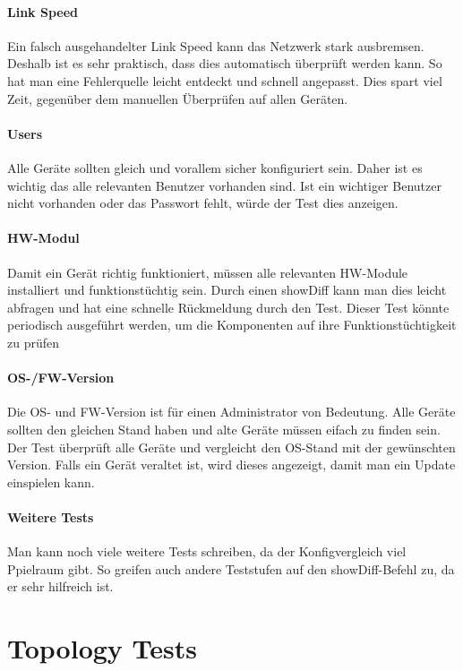 \documentclass[a4,12pt]{scrartcl}
\begin{document}
\paragraph{Link Speed}\newline
Ein falsch ausgehandelter Link Speed kann das Netzwerk stark ausbremsen. Deshalb ist es sehr praktisch, dass dies automatisch überprüft werden kann. So hat man eine Fehlerquelle leicht entdeckt und schnell angepasst. Dies spart viel Zeit, gegenüber dem manuellen Überprüfen auf allen Geräten.
\paragraph{Users}\newline
Alle Geräte sollten gleich und vorallem sicher konfiguriert sein. Daher ist es wichtig das alle relevanten Benutzer vorhanden sind. Ist ein wichtiger Benutzer nicht vorhanden oder das Passwort fehlt, würde der Test dies anzeigen.
\paragraph{HW-Modul}\newline
Damit ein Gerät richtig funktioniert, müssen alle relevanten HW-Module installiert und funktionstüchtig sein. Durch einen showDiff kann man dies leicht abfragen und hat eine schnelle Rückmeldung durch den Test. Dieser Test könnte periodisch ausgeführt werden, um die Komponenten auf ihre Funk­ti­ons­tüch­tig­keit zu prüfen
\paragraph{OS-/FW-Version}\newline
Die OS- und FW-Version ist für einen Administrator von Bedeutung. Alle Geräte sollten den gleichen Stand haben und alte Geräte müssen eifach zu finden sein. Der Test überprüft alle Geräte und vergleicht den OS-Stand mit der gewünschten Version. Falls ein Gerät veraltet ist, wird dieses angezeigt, damit man ein Update einspielen kann.
\paragraph{Weitere Tests}\newline
Man kann noch viele weitere Tests schreiben, da der Konfigvergleich viel Ppielraum gibt. So greifen auch andere Teststufen auf den showDiff-Befehl zu, da er sehr hilfreich ist. 
\newpage
\section{Topology Tests}
\end{document}
